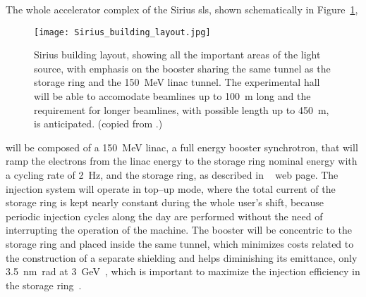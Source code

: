     The whole accelerator complex of the Sirius \gls{sls}, shown schematically in Figure~\ref{fig:accelerator_complex},
    \begin{figure}
        \centering
        \texttt{[image: Sirius\_building\_layout.jpg]}
        \caption[Sirius building layout.]{Sirius building layout, showing all the important areas of the light source, with emphasis on the booster sharing the same tunnel as the storage ring and the \SI{150}{\mega\electronvolt} \gls{linac} tunnel. The experimental hall will be able to accomodate beamlines up to \SI{100}{\meter} long and the requirement for longer beamlines, with possible length up to \SI{450}{\meter}, is anticipated. (copied from .)}
        \label{fig:accelerator_complex}
    \end{figure}
    will be composed of a \SI{150}{\mega\electronvolt} \gls{linac}, a full energy booster synchrotron, that will ramp the electrons from the \gls{linac} energy to the storage ring nominal energy with a cycling rate of \SI{2}{\hertz}, and the storage ring, as described in ~ web page. The injection system will operate in top--up mode, where the total current of the storage ring is kept nearly constant during the whole user's shift, because periodic injection cycles along the day are performed without the need of interrupting the operation of the machine. The booster will be concentric to the storage ring and placed inside the same tunnel, which minimizes costs related to the construction of a separate shielding and helps diminishing its emittance, only \SI{3.5}{\nano\meter\radian} at \SI{3}{\giga\electronvolt}~\cite{Sa2014a}, which is important to maximize the injection efficiency in the storage ring~\cite{Liu2016a}.

